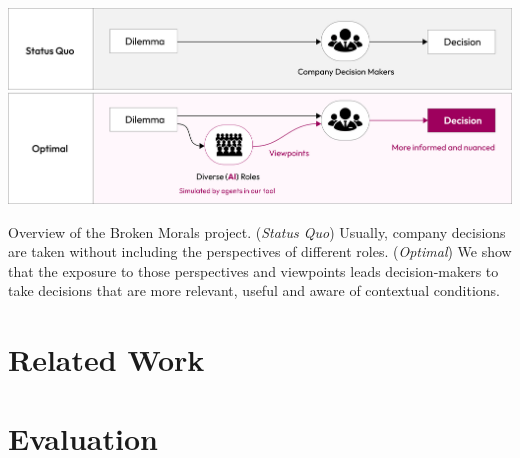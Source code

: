 \documentclass[sigconf, authorversion, nonacm, screen]{acmart}
\begin{document}
\begin{teaserfigure}
  \includegraphics[width=\textwidth]{teaser}
  \caption{Overview of the Broken Morals project. (\textit{Status Quo}) Usually, company decisions are taken without including the perspectives of different roles. (\textit{Optimal}) We show that the exposure to those perspectives and viewpoints leads decision-makers to take decisions that are more relevant, useful and aware of contextual conditions.}
  \label{fig:teaser}
\end{teaserfigure}

\maketitle

\section{Related Work}





\section{Evaluation}
\end{document}
